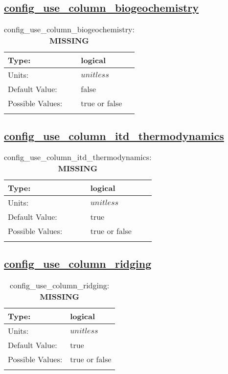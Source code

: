 \subsection[config\_use\_column\_biogeochemistry]{\hyperref[sec:nm_tab_column_package]{config\_use\_column\_biogeochemistry}}
\label{subsec:nm_sec_config_use_column_biogeochemistry}
\begin{center}
\begin{longtable}{| p{2.0in} || p{4.0in} |}
    \hline
    Type: & logical \\
    \hline
    Units: & $unitless$ \\
    \hline
    Default Value: & false \\
    \hline
    Possible Values: & true or false \\
    \hline
    \caption{config\_use\_column\_biogeochemistry: {\bf \color{red} MISSING}}
\end{longtable}
\end{center}
\subsection[config\_use\_column\_itd\_thermodynamics]{\hyperref[sec:nm_tab_column_package]{config\_use\_column\_itd\_thermodynamics}}
\label{subsec:nm_sec_config_use_column_itd_thermodynamics}
\begin{center}
\begin{longtable}{| p{2.0in} || p{4.0in} |}
    \hline
    Type: & logical \\
    \hline
    Units: & $unitless$ \\
    \hline
    Default Value: & true \\
    \hline
    Possible Values: & true or false \\
    \hline
    \caption{config\_use\_column\_itd\_thermodynamics: {\bf \color{red} MISSING}}
\end{longtable}
\end{center}
\subsection[config\_use\_column\_ridging]{\hyperref[sec:nm_tab_column_package]{config\_use\_column\_ridging}}
\label{subsec:nm_sec_config_use_column_ridging}
\begin{center}
\begin{longtable}{| p{2.0in} || p{4.0in} |}
    \hline
    Type: & logical \\
    \hline
    Units: & $unitless$ \\
    \hline
    Default Value: & true \\
    \hline
    Possible Values: & true or false \\
    \hline
    \caption{config\_use\_column\_ridging: {\bf \color{red} MISSING}}
\end{longtable}
\end{center}
